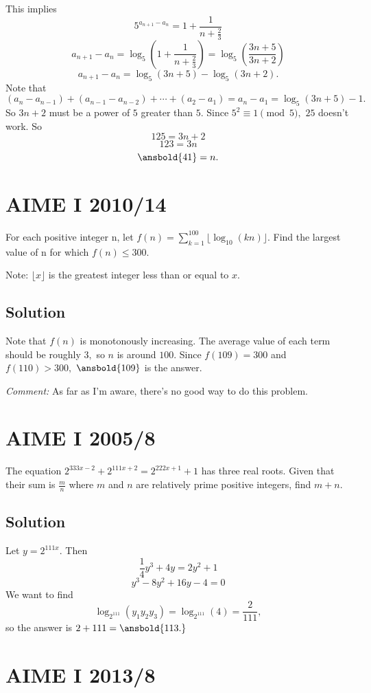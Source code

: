 \documentclass{article}
\begin{document}
This implies
    \[5^{a_{n+1}-a_n}=1+\frac{1}{n+\frac{2}{3}}\]
    \[a_{n+1}-a_n=\log_5(1+\frac{1}{n+\frac{2}{3}})=\log_5(\frac{3n+5}{3n+2})\]
    \[a_{n+1}-a_n=\log_5(3n+5)-\log_5(3n+2).\]
    Note that $(a_{n}-a_{n-1})+(a_{n-1}-a_{n-2})+\cdots+(a_{2}-a_{1})=a_n-a_1=\log_5(3n+5)-1.$ So $3n+2$ must be a power of $5$ greater than $5.$ Since $5^2\equiv 1\pmod{5},$ $25$ doesn't work. So
    \[125=3n+2\]
    \[123=3n\]
    \[\ansbold{41}=n.\]

\pagebreak\section{AIME I 2010/14}

For each positive integer n, let $f(n) = \sum_{k = 1}^{100} \lfloor \log_{10} (kn) \rfloor$. Find the largest value of n for which $f(n) \le 300$.

Note: $\lfloor x \rfloor$ is the greatest integer less than or equal to $x$.

\subsection{Solution}

Note that $f(n)$ is monotonously increasing. The average value of each term should be roughly $3,$ so $n$ is around $100.$ Since $f(109)=300$ and $f(110)>300,$ $\ansbold{109}$ is the answer.

\textit{Comment:} As far as I'm aware, there's no good way to do this problem.

\pagebreak\section{AIME I 2005/8}

The equation $2^{333x-2} + 2^{111x+2} = 2^{222x+1} + 1$ has three real roots. Given that their sum is $\frac mn$ where $m$ and $n$ are relatively prime positive integers, find $m+n.$

\subsection{Solution}

Let $y=2^{111x}.$ Then
    \[\frac{1}{4}y^3+4y=2y^2+1\]
    \[y^3-8y^2+16y-4=0\]
    We want to find
    \[\log_{2^{111}}({y_1y_2y_3})=\log_{2^{111}}({4})=\frac{2}{111},\]
    so the answer is $2+111=\ansbold{113.}$

\pagebreak\section{AIME I 2013/8}
\end{document}
